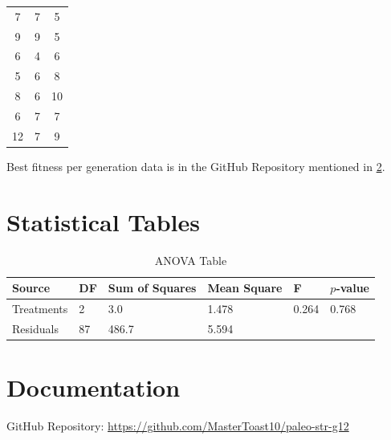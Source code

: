 \documentclass{strrespaper-trad}
\begin{document}
\begin{table}[htbp]
\begin{tabular}{ccc}
				7       & 7   & 5                         \\
				9       & 9   & 5                         \\
				6       & 4   & 6                         \\
				5       & 6   & 8                         \\
				8       & 6   & 10                        \\
				6       & 7   & 7                         \\
				12      & 7   & 9                         \\
				\bottomrule
			\end{tabular}
		\end{table}

		Best fitness per generation data is in the GitHub Repository mentioned in \ref{apx:documentation}.

	\chapter{Statistical Tables}
		\begin{table}[htbp]
			\centering
			\caption{ANOVA Table}
			\label{tab:ANOVA}
			\begin{tabular}{llllll}
				\toprule
				Source     & DF & Sum of Squares & Mean Square & F     & $p$-value \\
				\midrule
				Treatments & 2  & 3.0            & 1.478       & 0.264 & 0.768     \\
				Residuals  & 87 & 486.7          & 5.594       &       &           \\
				\bottomrule
			\end{tabular}
		\end{table}

	\chapter{Documentation} \label{apx:documentation}
		\medskip\bigskip
		GitHub Repository: \url{https://github.com/MasterToast10/paleo-str-g12}
\end{document}
